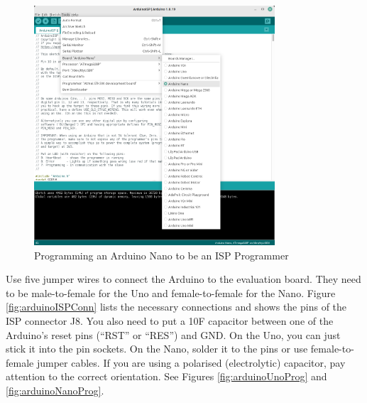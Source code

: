 \documentclass{article}
\begin{document}
\begin{figure}[htb]
\centering
\includegraphics[width=0.8\textwidth]{Pictures/ArduinoIDE.png}
\caption{Programming an Arduino Nano to be an ISP Programmer}
\label{fig:arduinoIDE}
\end{figure}

Use five jumper wires to connect the Arduino to the evaluation board. They need to be male-to-female for the Uno and female-to-female for the Nano. Figure \ref{fig:arduinoISPConn} lists the necessary connections and shows the pins of the ISP connector J8. You also need to put a 10\textmu F capacitor between one of the Arduino's reset pins (``RST'' or ``RES'') and GND. On the Uno, you can just stick it into the pin sockets. On the Nano, solder it to the pins or use female-to-female jumper cables. If you are using a polarised (electrolytic) capacitor, pay attention to the correct orientation. See Figures \ref{fig:arduinoUnoProg} and \ref{fig:arduinoNanoProg}. 
\end{document}
